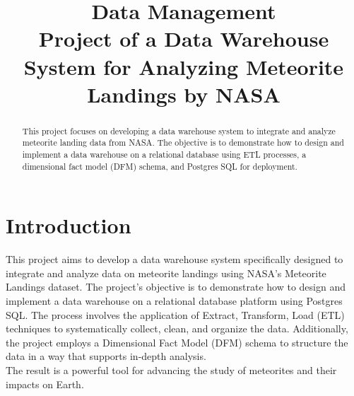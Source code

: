 \documentclass[conference]{IEEEtran}
\begin{document}
	
	\title{Data Management \\ Project of a Data Warehouse System for Analyzing Meteorite Landings by NASA}
	
	\author{
	}
	\maketitle
	
	\begin{abstract}
			This project focuses on developing a data warehouse system to integrate and analyze meteorite landing data from NASA. The objective is to demonstrate how to design and implement a data warehouse on a relational database using ETL processes, a dimensional fact model (DFM) schema, and Postgres SQL for deployment. 
	\end{abstract}
	
	\section{Introduction}
	
	This project aims to develop a data warehouse system specifically designed to integrate and analyze data on meteorite landings using NASA's Meteorite Landings dataset. The project’s objective is to demonstrate how to design and implement a data warehouse on a relational database platform using Postgres SQL. The process involves the application of Extract, Transform, Load (ETL) techniques to systematically collect, clean, and organize the data. Additionally, the project employs a Dimensional Fact Model (DFM) schema to structure the data in a way that supports in-depth analysis. \\ The result is a powerful tool for advancing the study of meteorites and their impacts on Earth.
	
\end{document}
